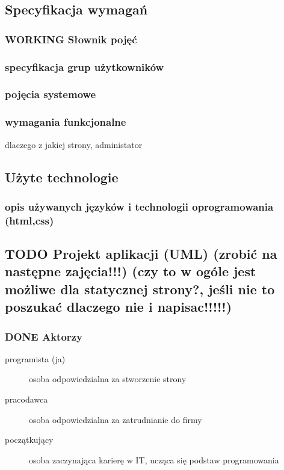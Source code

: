 \documentclass[11pt]{article}
\begin{document}
\subsection{Specyfikacja wymagań}
\label{sec:orgb5f07b0}
\subsubsection{{\bfseries\sffamily WORKING} Słownik pojęć}
\label{sec:org8011e52}
\subsubsection{specyfikacja grup użytkowników}
\label{sec:orgb595b09}
\subsubsection{pojęcia systemowe}
\label{sec:org9d61992}
\subsubsection{wymagania funkcjonalne}
\label{sec:org2d741fe}
dlaczego z jakiej strony, administator
\subsection{Użyte technologie}
\label{sec:org3a0cb69}
\subsubsection{opis używanych języków i technologii oprogramowania (html,css)}
\label{sec:org211c9b4}
\subsection{{\bfseries\sffamily TODO} Projekt aplikacji (UML) (zrobić na następne zajęcia!!!) (czy to w ogóle jest możliwe dla statycznej strony?, jeśli nie to poszukać dlaczego nie i napisac!!!!!)}
\label{sec:orgc15b29f}
\subsubsection{{\bfseries\sffamily DONE} Aktorzy}
\label{sec:org7bc48da}
\begin{description}
\item[{programista (ja)}] osoba odpowiedzialna za stworzenie strony
\item[{pracodawca}] osoba odpowiedzialna za zatrudnianie do firmy
\item[{początkujący}] osoba zaczynająca karierę w IT, ucząca się podstaw programowania
\end{description}
\end{document}
